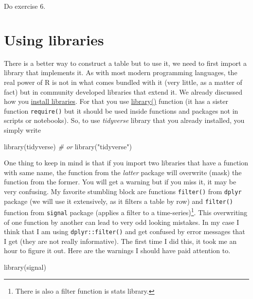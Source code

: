 \documentclass[
]{book}
\newenvironment{Shaded}{\begin{snugshade}}{\end{snugshade}}
\newcommand{\CommentTok}[1]{\textcolor[rgb]{0.56,0.35,0.01}{\textit{#1}}}
\newcommand{\FunctionTok}[1]{\textcolor[rgb]{0.00,0.00,0.00}{#1}}
\newcommand{\NormalTok}[1]{#1}
\newcommand{\StringTok}[1]{\textcolor[rgb]{0.31,0.60,0.02}{#1}}
\begin{document}
Do exercise 6.

\hypertarget{library}{%
\section{Using libraries}\label{library}}

There is a better way to construct a table but to use it, we need to first import a library that implements it. As with most modern programming languages, the real power of R is not in what comes bundled with it (very little, as a matter of fact) but in community developed libraries that extend it. We already discussed how you \protect\hyperlink{install.packages}{install libraries}. For that you use \href{https://www.rdocumentation.org/packages/base/versions/3.6.2/topics/library}{library()} function (it has a sister function \texttt{require()} but it should be used inside functions and packages not in scripts or notebooks). So, to use \emph{tidyverse} library that you already installed, you simply write

\begin{Shaded}
\begin{Highlighting}[]
\FunctionTok{library}\NormalTok{(tidyverse)}
\CommentTok{\# or}
\FunctionTok{library}\NormalTok{(}\StringTok{"tidyverse"}\NormalTok{)}
\end{Highlighting}
\end{Shaded}

One thing to keep in mind is that if you import two libraries that have a function with same name, the function from the \emph{latter} package will overwrite (mask) the function from the former. You will get a warning but if you miss it, it may be very confusing. My favorite stumbling block are functions \texttt{filter()} from \texttt{dplyr} package (we will use it extensively, as it filters a table by row) and \texttt{filter()} function from \texttt{signal} package (applies a filter to a time-series)\footnote{There is also a filter function is stats library.}. This overwriting of one function by another can lead to very odd looking mistakes. In my case I think that I am using \texttt{dplyr::filter()} and get confused by error messages that I get (they are not really informative). The first time I did this, it took me an hour to figure it out. Here are the warnings I should have paid attention to.

\begin{Shaded}
\begin{Highlighting}[]
\FunctionTok{library}\NormalTok{(signal)}
\end{Highlighting}
\end{Shaded}
\end{document}
